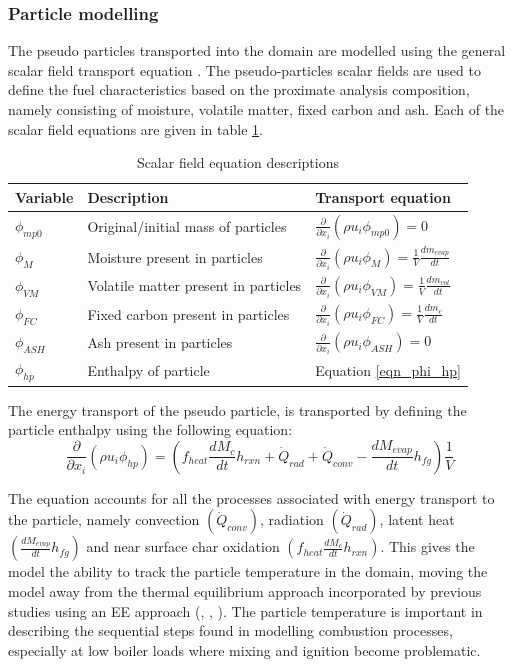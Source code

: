 \documentclass[review]{elsarticle}
\begin{document}
\subsubsection{Particle modelling}
The pseudo particles transported into the domain are modelled using the general scalar field transport equation \cite{Versteeg2007}. The pseudo-particles scalar fields are used to define the fuel characteristics based on the proximate analysis composition, namely consisting of moisture, volatile matter, fixed  carbon and ash. Each of the scalar field equations are given in table \ref{tab_scalars}.

\begin{table}[h!]
\centering
\caption{Scalar field equation descriptions}\label{tab_scalars}       
\begin{tabular}{lll}
\hline
Variable &Description& Transport equation \\
\hline
$\phi_{mp0}$ &Original/initial mass of particles& $\frac{\partial}{\partial x_{i}}(\rho u_{i} \phi_{mp0})=0$\\
$\phi_{M}$&Moisture present in particles&$\frac{\partial}{\partial x_{i}}(\rho u_{i} \phi_{M})=\frac{1}{V} \frac{dm_{evap}}{dt}$\\
$\phi_{VM}$&Volatile matter present in particles&  $\frac{\partial}{\partial x_{i}}(\rho u_{i} \phi_{VM})=\frac{1}{V}\frac{dm_{vol}}{dt}$\\
$\phi_{FC}$&Fixed carbon present in particles&$\frac{\partial}{\partial x_{i}}(\rho u_{i} \phi_{FC})=\frac{1}{V}\frac{dm_c}{dt}$\\
$\phi_{ASH}$&Ash present in particles&$\frac{\partial}{\partial x_{i}}(\rho u_{i} \phi_{ASH})=0$\\
$\phi_{hp}$&Enthalpy of particle&Equation \eqref{eqn_phi_hp}\\
\hline
\end{tabular}
\end{table}

The energy transport of the pseudo particle, is transported by defining the particle enthalpy using the following equation:
\begin{equation}\label{eqn_phi_hp}
\frac{\partial}{\partial x_{i}}(\rho u_{i} \phi_{hp})=\left(f_{heat}\frac{dM_{c}}{dt}h_{rxn} + \dot{Q}_{rad} + \dot{Q}_{conv} - \frac{dM_{evap}}{dt}h_{fg}\right)\frac{1}{V}
\end{equation}

The equation accounts for all the processes associated with energy transport to the particle, namely convection $\left(\dot{Q}_{conv}\right)$, radiation $\left(\dot{Q}_{rad}\right)$, latent heat $\left(\frac{dM_{evap}}{dt}h_{fg}\right)$ and near surface char oxidation $\left(f_{heat}\frac{dM_{c}}{dt}h_{rxn}\right)$. This gives the model the ability to track the particle temperature in the domain, moving the model away from the thermal equilibrium approach incorporated by previous studies using an EE approach (\cite{Benim2005}, \cite{Vicente2003}, \cite{Cai2015}). The particle temperature is important in describing the sequential steps found in modelling combustion processes, especially at low boiler loads where mixing and ignition become problematic.
\end{document}
